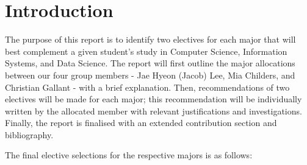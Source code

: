\section{\textbf{Introduction}}

The purpose of this report is to identify two electives for each major that will best complement a given student’s study in Computer Science, Information Systems, and Data Science. The report will first outline the major allocations between our four group members - Jae Hyeon (Jacob) Lee, Mia Childers, and Christian Gallant - with a brief explanation. Then, recommendations of two electives will be made for each major; this recommendation will be individually written by the allocated member with relevant justifications and investigations. Finally, the report is finalised with an extended contribution section and bibliography. 

The final elective selections for the respective majors is as follows: